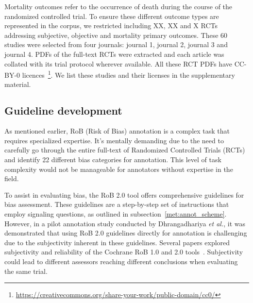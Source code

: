 \documentclass[sn-mathphys,Numbered]{sn-jnl}%
\theoremstyle{thmstyleone}%
\theoremstyle{thmstyletwo}%
\theoremstyle{thmstylethree}%
\begin{document}
Mortality outcomes refer to the occurrence of death during the course of the randomized controlled trial.
To ensure these different outcome types are represented in the corpus, we restricted including XX, XX and X RCTs addressing subjective, objective and mortality primary outcomes.
These 60 studies were selected from four journals: journal 1, journal 2, journal 3 and journal 4. 
PDFs of the full-text RCTs were extracted and each article was collated with its trial protocol wherever available.
All these RCT PDFs have CC-BY-0 licences~\footnote{\url{https://creativecommons.org/share-your-work/public-domain/cc0/}}.
We list these studies and their licenses in the supplementary material.

%
%
%
%
%
%
\subsection{Guideline development}
\label{guidelines}
%
As mentioned earlier, RoB (Risk of Bias) annotation is a complex task that requires specialized expertise.
It's mentally demanding due to the need to carefully go through the entire full-text of Randomized Controlled Trials (RCTs) and identify 22 different bias categories for annotation.
This level of task complexity would not be manageable for annotators without expertise in the field.


To assist in evaluating bias, the RoB 2.0 tool offers comprehensive guidelines for bias assessment.
These guidelines are a step-by-step set of instructions that employ signaling questions, as outlined in subsection~\ref{met:annot_scheme}.
However, in a pilot annotation study conducted by Dhrangadhariya \textit{et al.}, it was demonstrated that using RoB 2.0 guidelines directly for annotation is challenging due to the subjectivity inherent in these guidelines.
Several papers explored subjectivity and reliability of the Cochrane RoB 1.0 and 2.0 tools~\cite{minozzi2022reliability,da2017effect,loef2022interrater}.
Subjectivity could lead to different assessors reaching different conclusions when evaluating the same trial.
\end{document}
